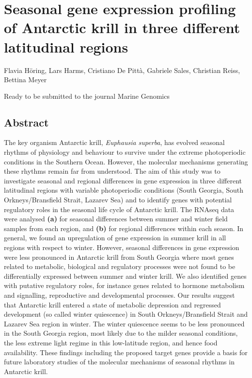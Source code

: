 \chapter{Seasonal gene expression profiling of Antarctic krill in three different latitudinal regions}

Flavia Höring, Lars Harms, Cristiano De Pittà, Gabriele Sales, Christian Reiss, Bettina Meyer

Ready to be submitted to the journal Marine Genomics

\section*{Abstract}
The key organism Antarctic krill, \textit{Euphausia superba}, has evolved seasonal rhythms of physiology and behaviour to survive under the extreme photoperiodic conditions in the Southern Ocean. However, the molecular mechanisms generating these rhythms remain far from understood. The aim of this study was to investigate seasonal and regional differences in gene expression in three different latitudinal regions with variable photoperiodic conditions (South Georgia, South Orkneys/Bransfield Strait, Lazarev Sea) and to identify genes with potential regulatory roles in the seasonal life cycle of Antarctic krill. The RNAseq data were analysed \textbf{(a)} for seasonal differences between summer and winter field samples from each region, and \textbf{(b)} for regional differences within each season. In general, we found an upregulation of gene expression in summer krill in all regions with respect to winter. However, seasonal differences in gene expression were less pronounced in Antarctic krill from South Georgia where most genes related to metabolic, biological and regulatory processes were not found to be differentially expressed between summer and winter krill. We also identified genes with putative regulatory roles, for instance genes related to hormone metabolism and signalling, reproductive and developmental processes. Our results suggest that Antarctic krill entered a state of metabolic depression and regressed development (so called winter quiescence) in South Orkneys/Bransfield Strait and Lazarev Sea region in winter. The winter quiescence seems to be less pronounced in the South Georgia region, most likely due to the milder seasonal conditions, the less extreme light regime in this low-latitude region, and hence food availability. These findings including the proposed target genes provide a basis for future laboratory studies of the molecular mechanisms of seasonal rhythms in Antarctic krill.

